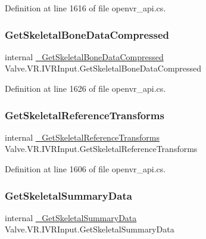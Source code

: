 Definition at line 1616 of file openvr\+\_\+api.\+cs.

\mbox{\label{struct_valve_1_1_v_r_1_1_i_v_r_input_aa014a0c1fcf2dfc354a96183bb6e711b}} 
\subsubsection{\texorpdfstring{GetSkeletalBoneDataCompressed}{GetSkeletalBoneDataCompressed}}
{\footnotesize\ttfamily internal \mbox{\hyperlink{struct_valve_1_1_v_r_1_1_i_v_r_input_ac9cf8a486d0d66c088c2eb33b722111d}{\+\_\+\+Get\+Skeletal\+Bone\+Data\+Compressed}} Valve.\+V\+R.\+I\+V\+R\+Input.\+Get\+Skeletal\+Bone\+Data\+Compressed}



Definition at line 1626 of file openvr\+\_\+api.\+cs.

\mbox{\label{struct_valve_1_1_v_r_1_1_i_v_r_input_a617bf2834dfe52f9f0d0bed5c4bdcae1}} 
\subsubsection{\texorpdfstring{GetSkeletalReferenceTransforms}{GetSkeletalReferenceTransforms}}
{\footnotesize\ttfamily internal \mbox{\hyperlink{struct_valve_1_1_v_r_1_1_i_v_r_input_a1d1f340254e37a3037714eb5ee548afd}{\+\_\+\+Get\+Skeletal\+Reference\+Transforms}} Valve.\+V\+R.\+I\+V\+R\+Input.\+Get\+Skeletal\+Reference\+Transforms}



Definition at line 1606 of file openvr\+\_\+api.\+cs.

\mbox{\label{struct_valve_1_1_v_r_1_1_i_v_r_input_a1b266d7be02b592b13fd2886de0cff7f}} 
\subsubsection{\texorpdfstring{GetSkeletalSummaryData}{GetSkeletalSummaryData}}
{\footnotesize\ttfamily internal \mbox{\hyperlink{struct_valve_1_1_v_r_1_1_i_v_r_input_ae852c5f41c5b1d36119e74ee6dbad779}{\+\_\+\+Get\+Skeletal\+Summary\+Data}} Valve.\+V\+R.\+I\+V\+R\+Input.\+Get\+Skeletal\+Summary\+Data}



